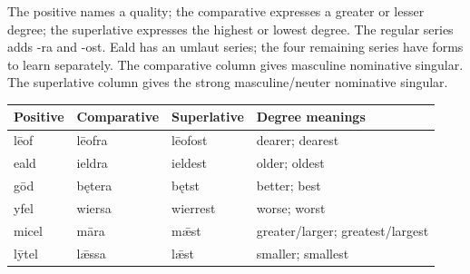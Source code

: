 The positive names a quality; the comparative expresses a greater or lesser degree; the superlative expresses the highest or lowest degree. The regular series adds -ra and -ost. Eald has an umlaut series; the four remaining series have forms to learn separately. The comparative column gives masculine nominative singular. The superlative column gives the strong masculine/\allowbreak{}neuter nominative singular.

\par\begingroup
\fontsize{10.5}{13.2}\selectfont
\setlength{\LTleft}{0pt}\setlength{\LTright}{\fill}
\noindent
\begin{tabular}{@{}>{\raggedright\arraybackslash}p{20.94mm}>{\raggedright\arraybackslash}p{23.03mm}>{\raggedright\arraybackslash}p{23.03mm}>{\raggedright\arraybackslash}p{48.57mm}@{}}
\toprule
\textbf{Positive} & \textbf{Comparative} & \textbf{Superlative} & \textbf{Degree meanings} \\
\midrule
lēof & lēofra & lēofost & dearer; dearest \\
eald & ieldra & ieldest & older; oldest \\
gōd & bętera & bętst & better; best \\
yfel & wiersa & wierrest & worse; worst \\
micel & māra & mǣst & greater/\allowbreak{}larger; greatest/\allowbreak{}largest \\
lȳtel & lǣssa & lǣst & smaller; smallest \\
\bottomrule
\end{tabular}
\par\endgroup

